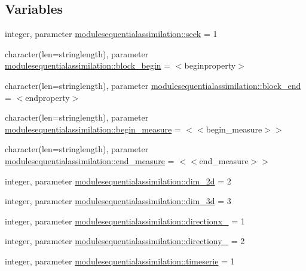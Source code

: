 \subsection*{Variables}
\begin{DoxyCompactItemize}
\item 
integer, parameter \mbox{\hyperlink{namespacemodulesequentialassimilation_a6bfe22e83fbd61cf96b89f47b9c5457d}{modulesequentialassimilation\+::seek}} = 1
\item 
character(len=stringlength), parameter \mbox{\hyperlink{namespacemodulesequentialassimilation_ad4132c410b5be746f6b8bde4d0189f58}{modulesequentialassimilation\+::block\+\_\+begin}} = \textquotesingle{}$<$beginproperty$>$\textquotesingle{}
\item 
character(len=stringlength), parameter \mbox{\hyperlink{namespacemodulesequentialassimilation_a0ebbde5c40726c4eca6067a14224a1e3}{modulesequentialassimilation\+::block\+\_\+end}} = \textquotesingle{}$<$endproperty$>$\textquotesingle{}
\item 
character(len=stringlength), parameter \mbox{\hyperlink{namespacemodulesequentialassimilation_a77da16ccbaea28106a79c214310680da}{modulesequentialassimilation\+::begin\+\_\+measure}} = \textquotesingle{}$<$$<$begin\+\_\+measure$>$$>$\textquotesingle{}
\item 
character(len=stringlength), parameter \mbox{\hyperlink{namespacemodulesequentialassimilation_a8d0203558728a88dd0a053f23e6c74b7}{modulesequentialassimilation\+::end\+\_\+measure}} = \textquotesingle{}$<$$<$end\+\_\+measure$>$$>$\textquotesingle{}
\item 
integer, parameter \mbox{\hyperlink{namespacemodulesequentialassimilation_a48f688b3f14326b500dfd683d18bd069}{modulesequentialassimilation\+::dim\+\_\+2d}} = 2
\item 
integer, parameter \mbox{\hyperlink{namespacemodulesequentialassimilation_aad55b299403480a62edd2b52abc58065}{modulesequentialassimilation\+::dim\+\_\+3d}} = 3
\item 
integer, parameter \mbox{\hyperlink{namespacemodulesequentialassimilation_aa961250cecdb6e41645fbc89696d9fdd}{modulesequentialassimilation\+::directionx\+\_\+}} = 1
\item 
integer, parameter \mbox{\hyperlink{namespacemodulesequentialassimilation_a1e47dbaf200f3d3d8d5d05f73c786294}{modulesequentialassimilation\+::directiony\+\_\+}} = 2
\item 
integer, parameter \mbox{\hyperlink{namespacemodulesequentialassimilation_af1500c1b270c95ca463c500d6af31177}{modulesequentialassimilation\+::timeserie}} = 1

\end{DoxyCompactItemize}
